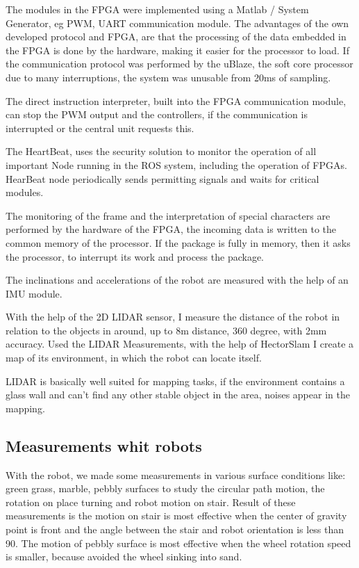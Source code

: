 \begin{titlepage}
The modules in the FPGA were implemented using a Matlab / System Generator, eg PWM, UART communication module. The advantages of the own developed protocol and FPGA, are that the processing of the data embedded in the FPGA is done by the hardware, making it easier for the processor to load.
If the communication protocol was performed by the uBlaze, the soft core processor due to many interruptions, the system was unusable from 20ms of sampling.


The direct instruction interpreter, built into the FPGA communication module, can stop the PWM output and the controllers, if the communication is interrupted or the central unit requests this.

The HeartBeat, uses the security solution to monitor the operation of all important Node running in the ROS system, including the operation of FPGAs. HearBeat node periodically sends permitting signals and waits for critical modules.

The monitoring of the frame and the interpretation of special characters are performed by the hardware of the FPGA, the incoming data is written to the common memory of the processor. If the package is fully in memory, then it asks the processor, to interrupt its work and process the package.

The inclinations and accelerations of the robot are measured with the help of an IMU module.

With the help of the 2D LIDAR sensor, I measure the distance of the robot in relation to the objects in around, up to 8m distance, 360 degree, with 2mm accuracy. Used the LIDAR Measurements, with the help of HectorSlam I create a map of its environment, in which the robot can locate itself.

LIDAR is basically well suited for mapping tasks, if the environment contains a glass wall and can’t find any other stable object in the area, noises appear in the mapping.



\subsection*{Measurements whit robots}

With the robot, we made some measurements in various surface conditions like: green grass, marble, pebbly surfaces to study the circular path motion, the rotation on place turning and robot motion on stair. Result of these measurements is the motion on stair is most effective when the center of gravity point is front and the angle between the stair and robot orientation is less than 90\degree. The motion of pebbly surface is most effective when the wheel rotation speed is smaller, because avoided the wheel sinking into sand.



\end{titlepage}
